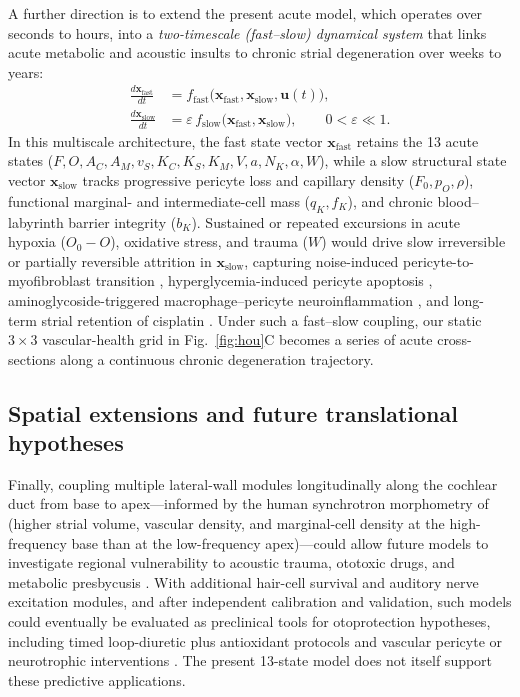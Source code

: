 \documentclass[final,5p,times]{elsarticle}
\begin{document}
A further direction is to extend the present acute model, which operates over seconds to hours, into a \emph{two-timescale (fast--slow) dynamical system} that links acute metabolic and acoustic insults to chronic strial degeneration over weeks to years:
\begin{equation}
  \begin{aligned}
    \frac{d\mathbf{x}_{\mathrm{fast}}}{dt} &= f_{\mathrm{fast}}\bigl(\mathbf{x}_{\mathrm{fast}}, \mathbf{x}_{\mathrm{slow}}, \mathbf{u}(t)\bigr),\\
    \frac{d\mathbf{x}_{\mathrm{slow}}}{dt} &= \varepsilon\,f_{\mathrm{slow}}\bigl(\mathbf{x}_{\mathrm{fast}}, \mathbf{x}_{\mathrm{slow}}\bigr), \qquad 0 < \varepsilon \ll 1.
  \end{aligned}
  \label{eq:fast-slow}
\end{equation}
In this multiscale architecture, the fast state vector \(\mathbf{x}_{\mathrm{fast}}\) retains the 13 acute states (\(F, O, A_C, A_M, v_S, K_C, K_S, K_M, V, a, N_K, \alpha, W\)), while a slow structural state vector \(\mathbf{x}_{\mathrm{slow}}\) tracks progressive pericyte loss and capillary density (\(F_0, p_O, \rho\)), functional marginal- and intermediate-cell mass (\(q_K, f_K\)), and chronic blood--labyrinth barrier integrity (\(b_K\)). Sustained or repeated excursions in acute hypoxia (\(O_0 - O\)), oxidative stress, and trauma (\(W\)) would drive slow irreversible or partially reversible attrition in \(\mathbf{x}_{\mathrm{slow}}\), capturing noise-induced pericyte-to-myofibroblast transition \citep{Hou2020}, hyperglycemia-induced pericyte apoptosis \citep{Shi2024}, aminoglycoside-triggered macrophage--pericyte neuroinflammation \citep{Li2026}, and long-term strial retention of cisplatin \citep{Breglio2017}. Under such a fast--slow coupling, our static \(3 \times 3\) vascular-health grid in Fig.~\ref{fig:hou}C becomes a series of acute cross-sections along a continuous chronic degeneration trajectory.

\subsection{Spatial extensions and future translational hypotheses}\label{sec:future-spatial}

Finally, coupling multiple lateral-wall modules longitudinally along the cochlear duct from base to apex---informed by the human synchrotron morphometry of \citet{Creff2026} (higher strial volume, vascular density, and marginal-cell density at the high-frequency base than at the low-frequency apex)---could allow future models to investigate regional vulnerability to acoustic trauma, ototoxic drugs, and metabolic presbycusis \citep{Schuknecht1974,Vaden2022}. With additional hair-cell survival and auditory nerve excitation modules, and after independent calibration and validation, such models could eventually be evaluated as preclinical tools for otoprotection hypotheses, including timed loop-diuretic plus antioxidant protocols \citep{Su2026} and vascular pericyte or neurotrophic interventions \citep{Hou2020}. The present 13-state model does not itself support these predictive applications.
\end{document}
